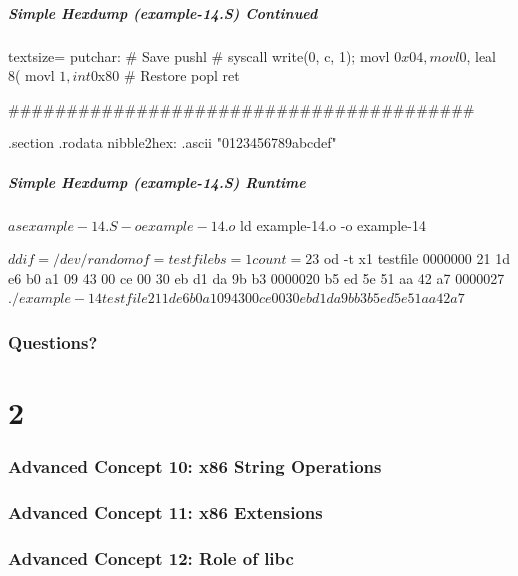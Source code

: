 \documentclass[11pt,xcolor=dvipsnames]{beamer}
\newcommand{\mvs}{\vspace{-0.95em}}
\begin{document}
\begin{frame}[fragile,t]
\mvs
\frametitle{Simple Hexdump (example-14.S) Continued}
\begin{gascode*}{textsize=}
putchar:
    # Save %
    pushl %
    # syscall write(0, c, 1);
    movl $0x04, %
    movl $0, %
    leal 8(%
    movl $1, %
    int $0x80
    # Restore %
    popl %
    ret

########################################

.section .rodata
nibble2hex: .ascii "0123456789abcdef"
\end{gascode*}
\end{frame}

\begin{frame}[fragile,t]
\mvs
\frametitle{Simple Hexdump (example-14.S) Runtime}
\begin{textcode}
$ as example-14.S -o example-14.o
$ ld example-14.o -o example-14

$ dd if=/dev/random of=testfile bs=1 count=23
$ od -t x1 testfile
0000000 21 1d e6 b0 a1 09 43 00 ce 00 30 eb d1 da 9b b3
0000020 b5 ed 5e 51 aa 42 a7
0000027
$ ./example-14 testfile
21 1d e6 b0 a1 09 43 00 ce 00 30 eb d1 da 9b b3
b5 ed 5e 51 aa 42 a7
$
\end{textcode}
\end{frame}

\section*{Questions?}

\part{2}

\section{Advanced Concept 10: x86 String Operations}

\section{Advanced Concept 11: x86 Extensions}

\section{Advanced Concept 12: Role of libc}
\end{document}
